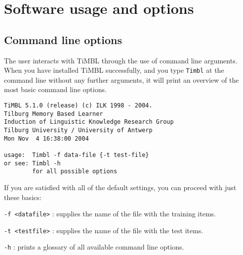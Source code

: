 \documentclass{report}
\begin{document}
\chapter{Software usage and options}
\label{reference}

\section{Command line options}
\label{commandline}

The user interacts with TiMBL through the use of command line arguments.
When you have installed TiMBL successfully, and you type {\tt Timbl} at the
command line without any further arguments, it will print an overview
of the most basic command line options. 

{\footnotesize
\begin{verbatim}
TiMBL 5.1.0 (release) (c) ILK 1998 - 2004.
Tilburg Memory Based Learner
Induction of Linguistic Knowledge Research Group
Tilburg University / University of Antwerp
Mon Nov  4 16:38:00 2004

usage:  Timbl -f data-file {-t test-file}
or see: Timbl -h
        for all possible options
\end{verbatim}
}

If you are satisfied with all of the default settings, you can proceed
with just these basics:

\begin{description}

\item {\tt -f <datafile>} : supplies the name of the file with the
training items.
\item {\tt -t <testfile>} : supplies the name of the file with the
test items.
\item {\tt -h} : prints a glossary of all available command line 
options.

\end{description}
\end{document}
